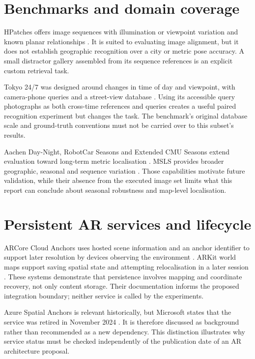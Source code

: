 \section{Benchmarks and domain coverage}
HPatches offers image sequences with illumination or viewpoint variation and known planar relationships \citep{balntas2017,hpatchesrepo}. It is suited to evaluating image alignment, but it does not establish geographic recognition over a city or metric pose accuracy. A small distractor gallery assembled from its sequence references is an explicit custom retrieval task.

Tokyo 24/7 was designed around changes in time of day and viewpoint, with camera-phone queries and a street-view database \citep{torii2015}. Using its accessible query photographs as both cross-time references and queries creates a useful paired recognition experiment but changes the task. The benchmark's original database scale and ground-truth conventions must not be carried over to this subset's results.

Aachen Day-Night, RobotCar Seasons and Extended CMU Seasons extend evaluation toward long-term metric localisation \citep{sattler2018,localizationbenchmark}. MSLS provides broader geographic, seasonal and sequence variation \citep{warburg2020}. Those capabilities motivate future validation, while their absence from the executed image set limits what this report can conclude about seasonal robustness and map-level localisation.

\section{Persistent AR services and lifecycle}
ARCore Cloud Anchors uses hosted scene information and an anchor identifier to support later resolution by devices observing the environment \citep{arcore}. ARKit world maps support saving spatial state and attempting relocalisation in a later session \citep{arkit}. These systems demonstrate that persistence involves mapping and coordinate recovery, not only content storage. Their documentation informs the proposed integration boundary; neither service is called by the experiments.

Azure Spatial Anchors is relevant historically, but Microsoft states that the service was retired in November 2024 \citep{azure}. It is therefore discussed as background rather than recommended as a new dependency. This distinction illustrates why service status must be checked independently of the publication date of an AR architecture proposal.

